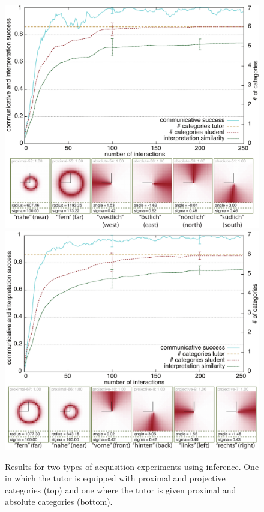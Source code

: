 \begin{figure} 
\begin{center}
\includegraphics[width=0.7\columnwidth]{figs/category-acquisition-absolute+proximal-results+categories}\\
\vspace{0.1cm}
\includegraphics[width=0.7\columnwidth]{figs/category-acquisition-projective+proximal-results+categories}
\end{center}
\caption[Results for dual acquisition experiments]{Results for two types of acquisition experiments using inference. 
One in which the tutor is equipped with proximal and projective 
categories (top) and one where the tutor is  given proximal and 
absolute categories (bottom).}
\label{f:category-acquisition-proj+prox++abs+prox-results}
\end{figure}

